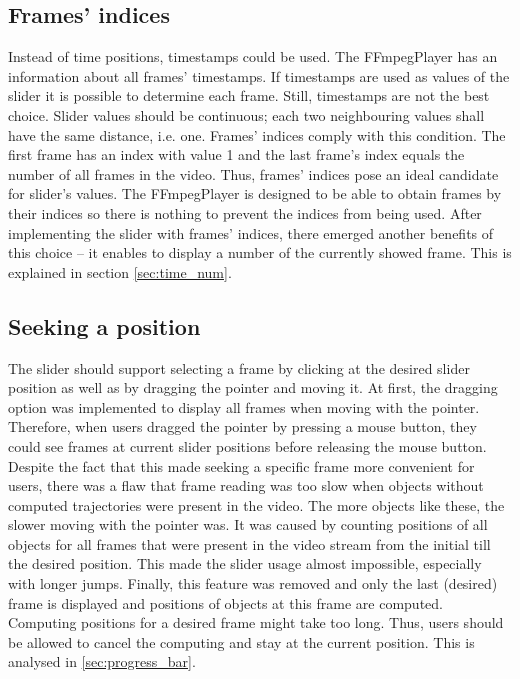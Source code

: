 \subsection{Frames' indices}
Instead of time positions, timestamps could be used. The FFmpegPlayer has an information about all frames’ timestamps. If timestamps are used as values of the slider it is possible to determine each frame. Still, timestamps are not the best choice. Slider values should be continuous; each two neighbouring values shall have the same distance, i.e. one. Frames’ indices comply with this condition. The first frame has an index with value 1 and the last frame’s index equals the number of all frames in the video. Thus, frames’ indices pose an ideal candidate for slider’s values. The FFmpegPlayer is designed to be able to obtain frames by their indices so there is nothing to prevent the indices from being used. After implementing the slider with frames’ indices, there emerged another benefits of this choice – it enables to display a number of the currently showed frame. This is explained in section \autoref{sec:time_num}.

\subsection{Seeking a position}
The slider should support selecting a frame by clicking at the desired slider position as well as by dragging the pointer and moving it. At first, the dragging option was implemented to display all frames when moving with the pointer. Therefore, when users dragged the pointer by pressing a mouse button, they could see frames at current slider positions before releasing the mouse button. Despite the fact that this made seeking a specific frame more convenient for users, there was a flaw that frame reading was too slow when objects without computed trajectories were present in the video. The more objects like these, the slower moving with the pointer was. It was caused by counting positions of all objects for all frames that were present in the video stream from the initial till the desired position. This made the slider usage almost impossible, especially with longer jumps. Finally, this feature was removed and only the last (desired) frame is displayed and positions of objects at this frame are computed. Computing positions for a desired frame might take too long. Thus, users should be allowed to cancel the computing and stay at the current position. This is analysed in \autoref{sec:progress_bar}.

